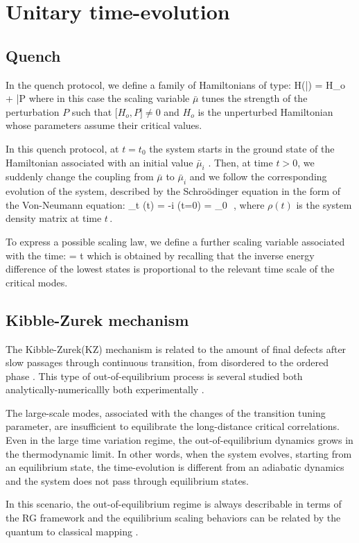 \section{Unitary time-evolution}



\subsection{Quench}

In the quench protocol, we define a family of Hamiltonians of type:
H(\bar \mu) = H_o + \bar\mu P \cm
\ea
where in this case the scaling variable $\bar \mu$ tunes the strength of the perturbation
$P$ such that $\Bigr[ H_o , P] \neq 0$ and $H_o$ is the unperturbed Hamiltonian 
whose parameters assume their critical values.

In this quench protocol, at $t = t_0$ the system starts in the ground state
of the Hamiltonian associated with an initial value $\bar \mu_i$ . Then, at time $t>0$, we
suddenly change the coupling from $\bar \mu$ to $\bar \mu _i$ and we follow the 
corresponding evolution of the system, described by the Schro\"odinger equation
in the form of the Von-Neumann equation:
\partial_t \rho(t) = -i  \qquad \rho(t=0) = \rho_0 \,\,,
\ea
where $\rho(t)$ is the system density matrix at time $t\,$.

To express a possible scaling law, we define a further scaling variable associated
with the time:
\theta = t \Delta \cm
\ee
which is obtained by recalling that the inverse energy difference of the lowest states
is proportional to the relevant time scale of the critical modes.

\subsection{Kibble-Zurek mechanism}

The Kibble-Zurek(KZ) mechanism is related to the amount of final defects after slow
passages through continuous transition, from disordered to the ordered phase 
\cite{kibble1976topology, kibble1980some, zurek1985cosmological, zurek1996cosmological, 
zurek2005dynamics}. This type of out-of-equilibrium process is several studied both
analytically-numericallly \cite{dziarmaga2010dynamics, PSSV-2011-noneqcoll,
chandran2012kibble, rossini2021coherent} both experimentally \cite{weiler2008spontaneous,
ulm2013observation}.

The large-scale modes, associated with the changes of the transition tuning parameter, are
insufficient to equilibrate the long-distance critical correlations. Even in the large
time variation regime, the out-of-equilibrium dynamics grows in the thermodynamic limit.
In other words, when the system evolves, starting from an equilibrium state, the
time-evolution is different from an adiabatic dynamics and the system does not pass 
through equilibrium states.

In this scenario, the out-of-equilibrium regime is always describable in terms of the RG
framework and the equilibrium scaling behaviors can be related by the quantum to classical
mapping \cite{rossini2021coherent, S99}.


